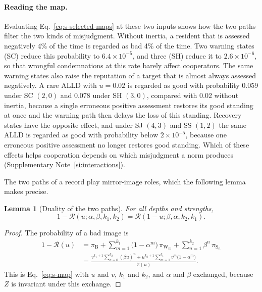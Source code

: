 \documentclass[10pt]{wlscirep}
\newcommand{\Rmap}{\mathscr{R}}            %
\newcommand{\st}[1]{\mathrm{#1}}           %
\theoremstyle{plain}
\newtheorem{lemma}{Lemma}
\theoremstyle{remark}
\begin{document}
\paragraph{Reading the map.} Evaluating Eq.~\eqref{eq:s-selected-maps} at these two inputs shows how the two paths filter the two kinds of misjudgment. Without inertia, a resident that is assessed negatively 4\% of the time is regarded as bad 4\% of the time. Two warning states (SC) reduce this probability to $6.4\times10^{-5}$, and three (SH) reduce it to $2.6\times10^{-6}$, so that wrongful condemnations at this rate barely affect cooperators. The same warning states also raise the reputation of a target that is almost always assessed negatively. A rare ALLD with $u=0.02$ is regarded as good with probability 0.059 under SC $(2,0)$ and 0.078 under SH $(3,0)$, compared with 0.02 without inertia, because a single erroneous positive assessment restores its good standing at once and the warning path then delays the loss of this standing. Recovery states have the opposite effect, and under SJ $(4,3)$ and SS $(1,2)$ the same ALLD is regarded as good with probability below $2\times10^{-5}$, because one erroneous positive assessment no longer restores good standing. Which of these effects helps cooperation depends on which misjudgment a norm produces (Supplementary Note~\ref{si:interactions}).

The two paths of a record play mirror-image roles, which the following lemma makes precise.

\begin{lemma}[Duality of the two paths]\label{lem:duality}
For all depths and strengths,
\begin{equation}
1-\Rmap(u;\alpha,\beta,k_1,k_2)=\Rmap(1-u;\beta,\alpha,k_2,k_1).
\label{eq:s-duality}
\end{equation}
\end{lemma}
\begin{proof}
The probability of a bad image is
\begin{equation}
\begin{aligned}
1-\Rmap(u)&=\pi_{\st B}+\sum_{m=1}^{k_1}\bigl(1-\alpha^m\bigr)\,\pi_{\st W_m}+\sum_{n=1}^{k_2}\beta^n\,\pi_{\st S_n}\\
&=\frac{v^{k_1+1}\sum_{n=0}^{k_2}(\beta u)^n+u^{k_2+1}\sum_{m=1}^{k_1}v^m\bigl(1-\alpha^m\bigr)}{Z(u)}.
\end{aligned}
\label{eq:s-badimage}
\end{equation}
This is Eq.~\eqref{eq:s-map} with $u$ and $v$, $k_1$ and $k_2$, and $\alpha$ and $\beta$ exchanged, because $Z$ is invariant under this exchange.
\end{proof}
\end{document}
